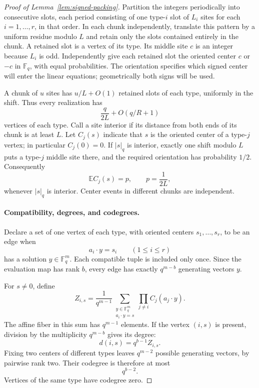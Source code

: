 \begin{proof}[Proof of Lemma~\ref{lem:signed-packing}]
Partition the integers periodically into consecutive slots, each period
consisting of one type-$i$ slot of $L_i$ sites for each $i=1,\ldots,r$,
in that order.  In each chunk independently, translate this pattern by
a uniform residue modulo $L$ and retain only the slots contained entirely
in the chunk.  A retained slot is a vertex of its type.  Its middle site
$c$ is an integer because $L_i$ is odd.  Independently give each retained
slot the oriented center $c$ or $-c$ in $\mathbb F_q$, with equal
probabilities.  The orientation specifies which signed center will enter
the linear equations; geometrically both signs will be used.

A chunk of $u$ sites has $u/L+O(1)$ retained slots of each type, uniformly
in the shift.  Thus every realization has
\begin{equation}
 \frac{q}{2L}+O(q/R+1)
 \label{eq:packing-vertex-count}
\end{equation}
vertices of each type.  Call a site interior if its distance from both
ends of its chunk is at least $L$.  Let $C_j(s)$ indicate that $s$ is the
oriented center of a type-$j$ vertex; in particular $C_j(0)=0$.
If $|s|_q$ is interior, exactly one shift modulo $L$ puts a type-$j$
middle site there, and the required orientation has probability $1/2$.
Consequently
\begin{equation}
 \mathbb E C_j(s)=p,\qquad p=\frac1{2L},
 \label{eq:packing-center-probability}
\end{equation}
whenever $|s|_q$ is interior.  Center events in different chunks are
independent.

\paragraph{Compatibility, degrees, and codegrees.}
Declare a set of one vertex of each type, with oriented centers
$s_1,\ldots,s_r$, to be an edge when
\[
 a_i\cdot y=s_i\qquad(1\le i\le r)
\]
has a solution $y\in\mathbb F_q^m$.  Each compatible tuple is included
only once.  Since the evaluation map has rank $b$, every edge has exactly
$q^{m-b}$ generating vectors $y$.

For $s\ne0$, define
\[
 Z_{i,s}=\frac1{q^{m-1}}
 \sum_{\substack{y\in\mathbb F_q^m\\a_i\cdot y=s}}
       \prod_{j\ne i}C_j(a_j\cdot y).
\]
The affine fiber in this sum has $q^{m-1}$ elements.  If the vertex
$(i,s)$ is present, division by the multiplicity $q^{m-b}$ gives its
degree:
\begin{equation}
 d(i,s)=q^{b-1}Z_{i,s}.
 \label{eq:packing-degree}
\end{equation}
Fixing two centers of different types leaves $q^{m-2}$ possible
generating vectors, by pairwise rank two.  Their codegree is therefore
at most
\begin{equation}
 q^{b-2}.
 \label{eq:packing-codegree}
\end{equation}
Vertices of the same type have codegree zero.


\end{proof}
